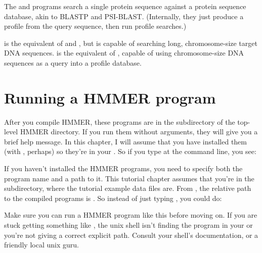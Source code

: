 The  and  programs search a single
protein sequence against a protein sequence database, akin to BLASTP
and PSI-BLAST.  (Internally, they just produce a profile from the
query sequence, then run profile searches.)

 is the equivalent of  and ,
but is capable of searching long, chromosome-size target DNA
sequences.   is the equivalent of ,
capable of using chromosome-size DNA sequences as a query into a
profile database.




\section{Running a HMMER program}
\label{section:running}

After you compile HMMER, these programs are in the 
subdirectory of the top-level HMMER directory. If you run them without
arguments, they will give you a brief help message.  In this
chapter, I will assume that you have installed them (with , perhaps) so they're in your . So if you type
 at the command line, you see:

  \vspace{1ex}
  \vspace{-1ex}
  \vspace{-1ex}

If you haven't installed the HMMER programs, you need to specify both
the program name and a path to it. This tutorial chapter assumes
that you're in the  subdirectory, where the tutorial
example data files are. From  , the relative
path to the compiled programs is . So instead of just
typing , you could do: 

  \vspace{1ex}
  \vspace{1ex}

Make sure you can run a HMMER program like this before moving on.  If
you are stuck getting something like , the unix shell isn't finding the program in your 
or you're not giving a correct explicit path. Consult your shell's
documentation, or a friendly local unix guru.


